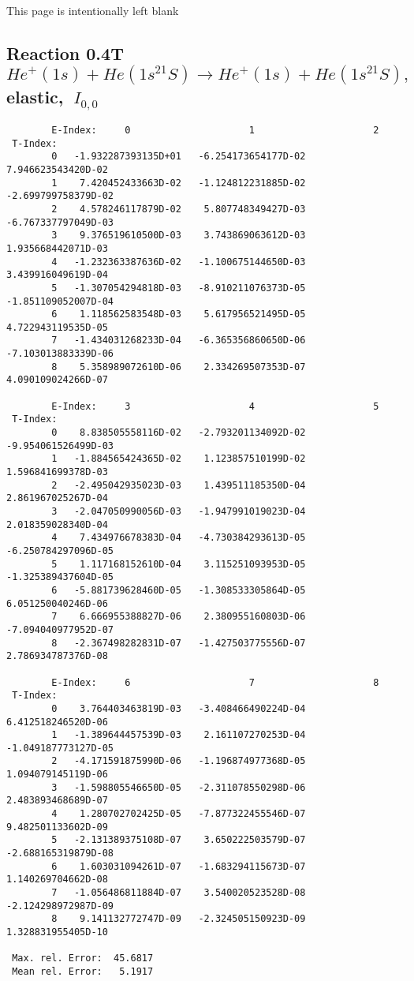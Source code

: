 \documentclass[12pt,dvipdfmx]{article}
\begin{document}
\newpage
This page is intentionally left blank
\newpage


\subsection{
Reaction 0.4T  $He^+(1s) + He(1s^21S) \rightarrow He^+(1s) + He(1s^21S) ,\ $
 elastic, $\  I_{0,0}$
}

\begin{small}\begin{verbatim}
        E-Index:     0                     1                     2
 T-Index:
        0   -1.932287393135D+01   -6.254173654177D-02    7.946623543420D-02
        1    7.420452433663D-02   -1.124812231885D-02   -2.699799758379D-02
        2    4.578246117879D-02    5.807748349427D-03   -6.767337797049D-03
        3    9.376519610500D-03    3.743869063612D-03    1.935668442071D-03
        4   -1.232363387636D-02   -1.100675144650D-03    3.439916049619D-04
        5   -1.307054294818D-03   -8.910211076373D-05   -1.851109052007D-04
        6    1.118562583548D-03    5.617956521495D-05    4.722943119535D-05
        7   -1.434031268233D-04   -6.365356860650D-06   -7.103013883339D-06
        8    5.358989072610D-06    2.334269507353D-07    4.090109024266D-07

        E-Index:     3                     4                     5
 T-Index:
        0    8.838505558116D-02   -2.793201134092D-02   -9.954061526499D-03
        1   -1.884565424365D-02    1.123857510199D-02    1.596841699378D-03
        2   -2.495042935023D-03    1.439511185350D-04    2.861967025267D-04
        3   -2.047050990056D-03   -1.947991019023D-04    2.018359028340D-04
        4    7.434976678383D-04   -4.730384293613D-05   -6.250784297096D-05
        5    1.117168152610D-04    3.115251093953D-05   -1.325389437604D-05
        6   -5.881739628460D-05   -1.308533305864D-05    6.051250040246D-06
        7    6.666955388827D-06    2.380955160803D-06   -7.094040977952D-07
        8   -2.367498282831D-07   -1.427503775556D-07    2.786934787376D-08

        E-Index:     6                     7                     8
 T-Index:
        0    3.764403463819D-03   -3.408466490224D-04    6.412518246520D-06
        1   -1.389644457539D-03    2.161107270253D-04   -1.049187773127D-05
        2   -4.171591875990D-06   -1.196874977368D-05    1.094079145119D-06
        3   -1.598805546650D-05   -2.311078550298D-06    2.483893468689D-07
        4    1.280702702425D-05   -7.877322455546D-07    9.482501133602D-09
        5   -2.131389375108D-07    3.650222503579D-07   -2.688165319879D-08
        6    1.603031094261D-07   -1.683294115673D-07    1.140269704662D-08
        7   -1.056486811884D-07    3.540020523528D-08   -2.124298972987D-09
        8    9.141132772747D-09   -2.324505150923D-09    1.328831955405D-10

 Max. rel. Error:  45.6817
 Mean rel. Error:   5.1917
\end{verbatim}\end{small}
\end{document}

